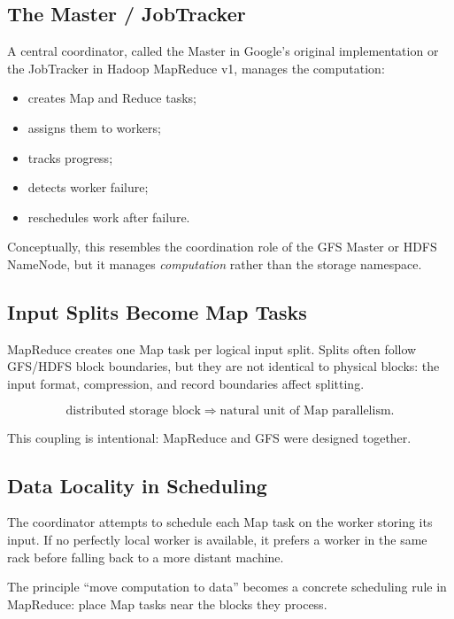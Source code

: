 \documentclass[11pt,a4paper,oneside]{book}
\begin{document}
\subsection{The Master / JobTracker}

A central coordinator, called the Master in Google's original implementation or the JobTracker in Hadoop MapReduce v1, manages the computation:

\begin{itemize}
    \item creates Map and Reduce tasks;
    \item assigns them to workers;
    \item tracks progress;
    \item detects worker failure;
    \item reschedules work after failure.
\end{itemize}

Conceptually, this resembles the coordination role of the GFS Master or HDFS NameNode, but it manages \emph{computation} rather than the storage namespace.

\subsection{Input Splits Become Map Tasks}

MapReduce creates one Map task per logical input split. Splits often follow GFS/HDFS block boundaries, but they are not identical to physical blocks: the input format, compression, and record boundaries affect splitting.

\[
\text{distributed storage block}
\Longrightarrow
\text{natural unit of Map parallelism}.
\]

This coupling is intentional: MapReduce and GFS were designed together.

\subsection{Data Locality in Scheduling}

The coordinator attempts to schedule each Map task on the worker storing its input. If no perfectly local worker is available, it prefers a worker in the same rack before falling back to a more distant machine.

\begin{keyconcept}
The principle ``move computation to data'' becomes a concrete scheduling rule in MapReduce: place Map tasks near the blocks they process.
\end{keyconcept}
\end{document}
